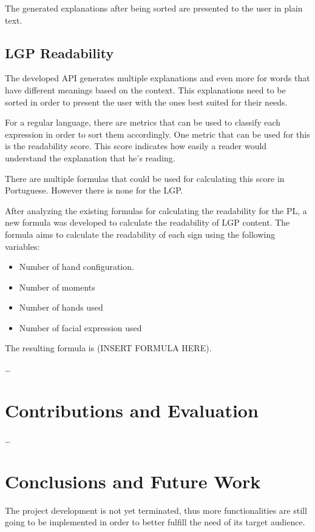 \documentclass[runningheads]{llncs}
\begin{document}
The generated explanations after being sorted are presented to the user in plain text.

\subsection{LGP Readability}

The developed API generates multiple explanations and even more for words that have different meanings based on the context.
This explanations need to be sorted in order to present the user with the ones best suited for their needs.

For a regular language, there are metrics that can be used to classify each expression in order to sort them accordingly.
One metric that can be used for this is the readability score.
This score indicates how easily a reader would understand the explanation that he's reading.

There are multiple formulas that could be used for calculating this score in Portuguese.
However there is none for the LGP.

After analyzing the existing formulas for calculating the readability for the PL, a new formula was developed to calculate the readability of LGP content.
The formula aims to calculate the readability of each sign using the following variables:

\begin{itemize}
    \item Number of hand configuration.
    \item Number of moments
    \item Number of hands used
    \item Number of facial expression used
\end{itemize}

The resulting formula is (INSERT FORMULA HERE).

\dots

\section{Contributions and Evaluation}

\dots

\section{Conclusions and Future Work}

The project development is not yet terminated, thus more functionalities are still going to be implemented in order to better fulfill the need of its target audience.
\end{document}
